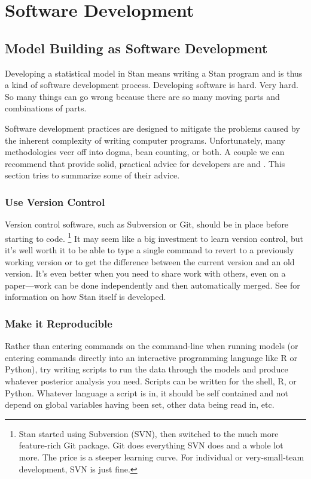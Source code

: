 \part{Software Development}


\chapter{Model Building as Software Development}

\noindent
Developing a statistical model in Stan means writing a Stan program
and is thus a kind of software development process.  Developing
software is hard.  Very hard.  So many things can go wrong because
there are so many moving parts and combinations of parts.

Software development practices are designed to mitigate the problems
caused by the inherent complexity of writing computer programs.
Unfortunately, many methodologies veer off into dogma, bean counting,
or both.  A couple we can recommend that provide solid, practical
advice for developers are \citep{HuntThomas:99} and
\citep{McConnell:2004}.  This section tries to summarize some of their
advice.

\section{Use Version Control}

Version control software, such as Subversion or Git, should be in
place before starting to code.%
%
\footnote{Stan started using Subversion (SVN), then switched to the
  much more feature-rich Git package.  Git does everything SVN does
  and a whole lot more.  The price is a steeper learning curve.  For
  individual or very-small-team development, SVN is just fine.}
%
It may seem like a big investment to learn version control, but it's
well worth it to be able to type a single command to revert to a
previously working version or to get the difference between the
current version and an old version.  It's even better when you need
to share work with others, even on a paper---work can be done
independently and then automatically merged.  See
 for information on how Stan itself
is developed.


\section{Make it Reproducible}

Rather than entering commands on the command-line when running models
(or entering commands directly into an interactive programming
language like R or Python), try writing scripts to run the data
through the models and produce whatever posterior analysis you need.
Scripts can be written for the shell, R, or Python.  Whatever language
a script is in, it should be self contained and not depend on global
variables having been set, other data being read in, etc.  

